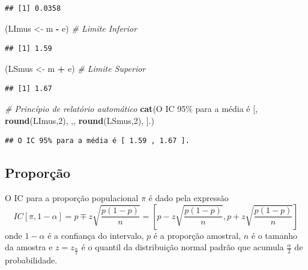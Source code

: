 \documentclass[
]{book}
\newenvironment{Shaded}{\begin{snugshade}}{\end{snugshade}}
\newcommand{\CommentTok}[1]{\textcolor[rgb]{0.56,0.35,0.01}{\textit{#1}}}
\newcommand{\DecValTok}[1]{\textcolor[rgb]{0.00,0.00,0.81}{#1}}
\newcommand{\KeywordTok}[1]{\textcolor[rgb]{0.13,0.29,0.53}{\textbf{#1}}}
\newcommand{\NormalTok}[1]{#1}
\newcommand{\OperatorTok}[1]{\textcolor[rgb]{0.81,0.36,0.00}{\textbf{#1}}}
\newcommand{\StringTok}[1]{\textcolor[rgb]{0.31,0.60,0.02}{#1}}
\theoremstyle{definition}
\theoremstyle{definition}
\theoremstyle{definition}
\theoremstyle{remark}
\begin{document}
\begin{verbatim}
## [1] 0.0358
\end{verbatim}

\begin{Shaded}
\begin{Highlighting}[]
\NormalTok{(LImus \textless{}{-}}\StringTok{ }\NormalTok{m }\OperatorTok{{-}}\StringTok{ }\NormalTok{e)                }\CommentTok{\# Limite Inferior}
\end{Highlighting}
\end{Shaded}

\begin{verbatim}
## [1] 1.59
\end{verbatim}

\begin{Shaded}
\begin{Highlighting}[]
\NormalTok{(LSmus \textless{}{-}}\StringTok{ }\NormalTok{m }\OperatorTok{+}\StringTok{ }\NormalTok{e)                }\CommentTok{\# Limite Superior}
\end{Highlighting}
\end{Shaded}

\begin{verbatim}
## [1] 1.67
\end{verbatim}

\begin{Shaded}
\begin{Highlighting}[]
\CommentTok{\# Princípio de relatório automático}
\KeywordTok{cat}\NormalTok{(}\StringTok{\textquotesingle{}O IC 95\% para a média é [\textquotesingle{}}\NormalTok{, }
    \KeywordTok{round}\NormalTok{(LImus,}\DecValTok{2}\NormalTok{), }\StringTok{\textquotesingle{},\textquotesingle{}}\NormalTok{, }
    \KeywordTok{round}\NormalTok{(LSmus,}\DecValTok{2}\NormalTok{), }\StringTok{\textquotesingle{}].\textquotesingle{}}\NormalTok{)}
\end{Highlighting}
\end{Shaded}

\begin{verbatim}
## O IC 95% para a média é [ 1.59 , 1.67 ].
\end{verbatim}

\hypertarget{proporuxe7uxe3o-1}{%
\subsection{Proporção}\label{proporuxe7uxe3o-1}}

O IC para a proporção populacional \(\pi\) é dado pela expressão
\begin{equation}
IC \left[ \pi, 1-\alpha \right] = p \mp z \sqrt{\dfrac{p(1-p)}{n}} = \left[ p - z \sqrt{\dfrac{p(1-p)}{n}}, p + z \sqrt{\dfrac{p(1-p)}{n}} \right]
\label{eq:ic-prop}
\end{equation}
onde \(1-\alpha\) é a confiança do intervalo, \(p\) é a proporção amostral, \(n\) é o tamanho da amostra e \(z=z_{\frac{\alpha}{2}}\) é o quantil da distribuição normal padrão que acumula \(\frac{\alpha}{2}\) de probabilidade.
\end{document}
